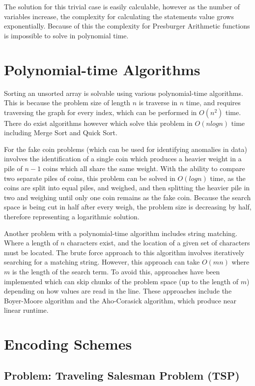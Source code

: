 \documentclass{article}
\renewcommand{\_}{\ifincsname_\else\legacyunderscore\fi}
\begin{document}
The solution for this trivial case is easily calculable, however as the number of variables increase, the complexity for calculating the statements value grows exponentially. Because of this the complexity for Presburger Arithmetic functions is impossible to solve in polynomial time.

\section{Polynomial-time Algorithms}

Sorting an unsorted array is solvable using various polynomial-time algorithms. This is because the problem size of length $n$ is traverse in $n$ time, and requires traversing the graph for every index, which can be performed in $O(n^2)$ time. There do exist algorithms however which solve this problem in $O(n log n)$ time including Merge Sort and Quick Sort.

For the fake coin problems (which can be used for identifying anomalies in data) involves the identification of a single coin which produces a heavier weight in a pile of $n-1$ coins which all share the same weight. With the ability to compare two separate piles of coins, this problem can be solved in $O(log n)$ time, as the coins are split into equal piles, and weighed, and then splitting the heavier pile in two and weighing until only one coin remains as the fake coin. Because the search space is being cut in half after every weigh, the problem size is decreasing by half, therefore representing a logarithmic solution.

Another problem with a polynomial-time algorithm includes string matching. Where a length of $n$ characters exist, and the location of a given set of characters must be located. The brute force approach to this algorithm involves iteratively searching for a matching string. However, this approach can take $O(mn)$ where $m$ is the length of the search term. To avoid this, approaches have been implemented which can skip chunks of the problem space (up to the length of $m$) depending on how values are read in the line. These approaches include the Boyer-Moore algorithm and the Aho-Corasick algorithm, which produce near linear runtime.
\section{Encoding Schemes}
\subsection{Problem: Traveling Salesman Problem (TSP)}
\end{document}
